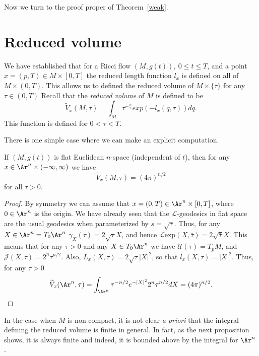 Now we turn to the proof proper of Theorem~\ref{weak}.

\section{Reduced volume}



We have established that for a Ricci flow $(M,g(t)),\ 0\le t\le T$,
and a point  $x=(p,T)\in M\times [0,T]$ the reduced length function
$l_x$ is defined on all of $M\times (0,T)$. This allows us to
defined the reduced volume of $M\times \{\tau\}$ for any $\tau\in
(0,T)$ Recall that the {\sl reduced volume} of
$M$ is defined to be
$$\widetilde V_x(M,\tau) = \int_{M} \tau^{-\frac{n}{2}}exp(-l_x(q,\tau))dq.$$
This function is defined for $0<\tau<T$.

There is one simple case where we can make an explicit computation.
\begin{lemma}
\label{lem:reduced-volume-flat-space}
\label{flat}
If $(M,g(t))$ is flat Euclidean $n$-space (independent of $t$), then
for any $x\in \Ar^n\times (-\infty,\infty)$ we have
$$\widetilde V_x(M,\tau)=(4\pi)^{n/2}$$ for all $\tau>0$.
\end{lemma}

\begin{proof}\sketch
By symmetry we can assume that $x=(0,T)\in \Ar^n\times [0,T]$, where
$0\in \Ar^n$ is the origin. We have already seen that the ${\mathcal
L}$-geodesics in flat space are the usual geodesics when
parameterized by $s=\sqrt{\tau}$. Thus, for any $X\in
\Ar^n=T_0\Ar^n$ $\gamma_X(\tau)=2\sqrt{\tau}X$, and hence ${\mathcal
L}\mathrm{exp}(X,\bar\tau)=2\sqrt{\bar\tau}X$. This means that for any
$\tau>0$ and any $X\in T_0\Ar^n$ we have ${\mathcal U}(\tau)=T_pM$,
and ${\mathcal J}(X,\tau)=2^n\tau^{n/2}$. Also,
 $L_x(X,\tau)=2\sqrt{\tau}|X|^2$, so that $l_x(X,\tau)=|X|^2$.
 Thus, for any $\tau>0$
 $$\widetilde
 V_x(\Ar^n,\tau)=\int_{\Ar^n}\tau^{-n/2}e^{-|X|^2}2^n\tau^{n/2}dX=(4\pi)^{n/2}.$$
\end{proof}


In the case when $M$ is non-compact, it is not clear {\em a priori}
that the integral defining the reduced volume is finite in general.
In fact, as the next proposition shows, it is always finite and
indeed, it is bounded above by the integral for  $\Ar^n$.

